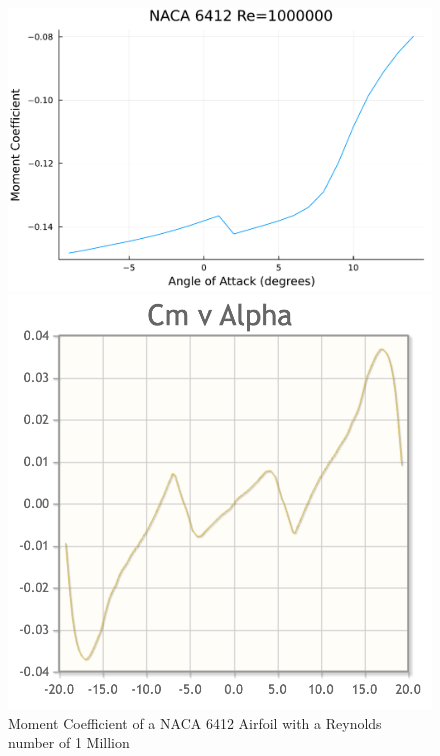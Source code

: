 \documentclass{article}
\begin{document}
\begin{figure}[h]
    \centering
\begin{minipage}[b]{0.32\textwidth}
\centering
\includegraphics[width=\textwidth]{NACA 6412 Re=1000000_Moment_Coefficent_Plot.pdf}
\caption{\label{fig:NACA 6412 Moment}Moment Coefficient of a NACA 6412 Airfoil with a Reynolds number of 1 Million}
\end{minipage}
\begin{minipage}[b]{0.32\textwidth}
\centering
\includegraphics[width=\textwidth]{Screenshot 2024-09-11 at 7.29.20 PM.png}

\end{minipage}
\end{figure}
\end{document}
